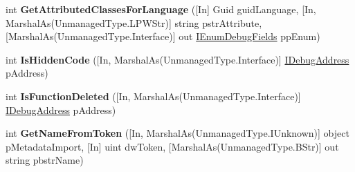 \begin{DoxyCompactItemize}
\item 
\hypertarget{interface_microsoft_1_1_visual_studio_1_1_debugger_1_1_interop_e_e_1_1_i_debug_com_plus_symbol_provider2_a07fe36d1ea4943334d3cf39465bb24e1}{int {\bfseries Get\+Attributed\+Classes\+For\+Language} (\mbox{[}In\mbox{]} Guid guid\+Language, \mbox{[}In, Marshal\+As(Unmanaged\+Type.\+L\+P\+W\+Str)\mbox{]} string pstr\+Attribute, \mbox{[}Marshal\+As(Unmanaged\+Type.\+Interface)\mbox{]} out \hyperlink{interface_microsoft_1_1_visual_studio_1_1_debugger_1_1_interop_e_e_1_1_i_enum_debug_fields}{I\+Enum\+Debug\+Fields} pp\+Enum)}\label{interface_microsoft_1_1_visual_studio_1_1_debugger_1_1_interop_e_e_1_1_i_debug_com_plus_symbol_provider2_a07fe36d1ea4943334d3cf39465bb24e1}

\item 
\hypertarget{interface_microsoft_1_1_visual_studio_1_1_debugger_1_1_interop_e_e_1_1_i_debug_com_plus_symbol_provider2_a6626fc38b3fe347fd9f678f9787ac6ca}{int {\bfseries Is\+Hidden\+Code} (\mbox{[}In, Marshal\+As(Unmanaged\+Type.\+Interface)\mbox{]} \hyperlink{interface_microsoft_1_1_visual_studio_1_1_debugger_1_1_interop_e_e_1_1_i_debug_address}{I\+Debug\+Address} p\+Address)}\label{interface_microsoft_1_1_visual_studio_1_1_debugger_1_1_interop_e_e_1_1_i_debug_com_plus_symbol_provider2_a6626fc38b3fe347fd9f678f9787ac6ca}

\item 
\hypertarget{interface_microsoft_1_1_visual_studio_1_1_debugger_1_1_interop_e_e_1_1_i_debug_com_plus_symbol_provider2_a73173c6a5817c15186c9dc6f2f7f911e}{int {\bfseries Is\+Function\+Deleted} (\mbox{[}In, Marshal\+As(Unmanaged\+Type.\+Interface)\mbox{]} \hyperlink{interface_microsoft_1_1_visual_studio_1_1_debugger_1_1_interop_e_e_1_1_i_debug_address}{I\+Debug\+Address} p\+Address)}\label{interface_microsoft_1_1_visual_studio_1_1_debugger_1_1_interop_e_e_1_1_i_debug_com_plus_symbol_provider2_a73173c6a5817c15186c9dc6f2f7f911e}

\item 
\hypertarget{interface_microsoft_1_1_visual_studio_1_1_debugger_1_1_interop_e_e_1_1_i_debug_com_plus_symbol_provider2_a397fcb2c6ada0c4596e31a155d5d101d}{int {\bfseries Get\+Name\+From\+Token} (\mbox{[}In, Marshal\+As(Unmanaged\+Type.\+I\+Unknown)\mbox{]} object p\+Metadata\+Import, \mbox{[}In\mbox{]} uint dw\+Token, \mbox{[}Marshal\+As(Unmanaged\+Type.\+B\+Str)\mbox{]} out string pbstr\+Name)}\label{interface_microsoft_1_1_visual_studio_1_1_debugger_1_1_interop_e_e_1_1_i_debug_com_plus_symbol_provider2_a397fcb2c6ada0c4596e31a155d5d101d}


\end{DoxyCompactItemize}
